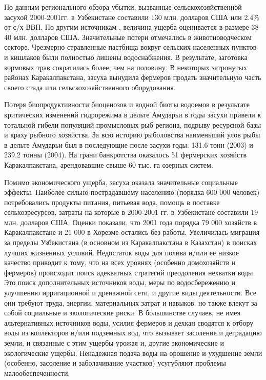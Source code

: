 По данным регионального обзора убытки, вызванные сельскохозяйственной засухой 2000-2001гг. в Узбекистане составили 130 млн. долларов США или 2.4\% от с/х ВВП. По другим источникам \cite{Zasuha2013}, величина ущерба оценивается в размере 38-40 млн. долларов США.
Значительные потери отмечались в животноводческом секторе. Чрезмерно стравленные пастбища вокруг сельских населенных пунктов и кишлаков были полностью лишены водоснабжения. В результате, заготовка кормовых трав сократилась более, чем на половину. В некоторых затронутых районах Каракалпакстана, засуха вынудила фермеров продать значительную часть своего стада или сельскохозяйственного оборудования.

Потеря биопродуктивности биоценозов и водной биоты водоемов в результате критических изменений гидрорежима в дельте Амударьи в годы засухи привели к тотальной гибели популяций промысловых рыб региона, подрыву ресурсной базы и краху рыбного хозяйства. За всю историю рыболовства наименьший улов рыбы в дельте Амударьи был в последующие после засухи годы: 131.6 тонн (2003) и 239.2 тонны (2004). На грани банкротства оказалось 51 фермерских хозяйств Каракалпакстана, арендовавшие свыше 60 тыс. га озерных систем.

Помимо экономического ущерба, засуха оказала значительные социальные эффекты. Наиболее сильно пострадавшему населению (порядка 600 000 человек) потребовались продукты питания, питьевая вода, помощь в поставке сельхозресурсов, затраты на которые в 2000-2001 гг. в Узбекистане составили 19 млн. долларов США. Оценки показали, что 2001 года порядка 79 000 хозяйств в Каракалпакстане и 21 000 в Хорезме остались без работы. Увеличилась миграция за пределы Узбекистана (в основном из Каракалпакстана в Казахстан) в поисках лучших жизненных условий. 
Недостаток воды для полива и/или ее низкое качество приводит к тому, что на всех уровнях (особенно домохозяйств и фермеров) происходит поиск адекватных стратегий преодоления нехватки воды. Это поиск дополнительных источников воды, меры по водосбережению и улучшению ирригационной и дренажной сети, и другие виды деятельности. Все они требуют труда, энергии, материальных затрат и навыков, но также влекут за собой социальные и экологические риски. В большинстве случаев, не имея альтернативных источников воды, усилия фермеров и дехкан сводятся к отбору воды из коллекторов и/или подземных вод, что вызывает засоление и деградацию земли, и связанные с этим ущербы урожая и, другие экономические и экологические ущербы. Ненадежная подача воды на орошение и ухудшение земли (особенно, засоление и заболачивание участков) усугубляют проблемы малообеспеченности.

